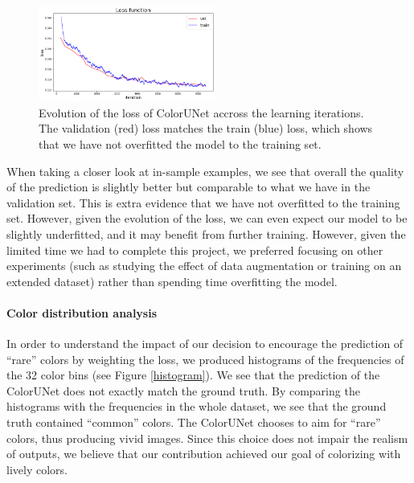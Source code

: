 \documentclass[10pt,twocolumn,letterpaper]{article}
\begin{document}
\begin{figure}
\begin{center}
\includegraphics[width=220px]{lossplot}
\caption{Evolution of the loss of ColorUNet accross the learning iterations. The validation (red) loss matches the train (blue) loss, which shows that we have not overfitted the model to the training set.}
\label{lossplot}
\end{center}
\end{figure}

When taking a closer look at in-sample examples, we see that overall the quality of the prediction is slightly better but comparable to what we have in the validation set. This is extra evidence that we have not overfitted to the training set. However, given the evolution of the loss, we can even expect our model to be slightly underfitted, and it may benefit from further training. However, given the limited time we had to complete this project, we preferred focusing on other experiments (such as studying the effect of data augmentation or training on an extended dataset) rather than spending time overfitting the model.


\paragraph{Color distribution analysis}


In order to understand the impact of our decision to encourage the prediction of ``rare'' colors by weighting the loss, we produced histograms of the frequencies of the 32 color bins (see Figure \ref{histogram}). We see that the prediction of the ColorUNet does not exactly match the ground truth. By comparing the histograms with the frequencies in the whole dataset, we see that the ground truth contained ``common'' colors. The ColorUNet chooses to aim for ``rare'' colors, thus producing vivid images. Since this choice does not impair the realism of outputs, we believe that our contribution achieved our goal of colorizing with lively colors.
\end{document}
